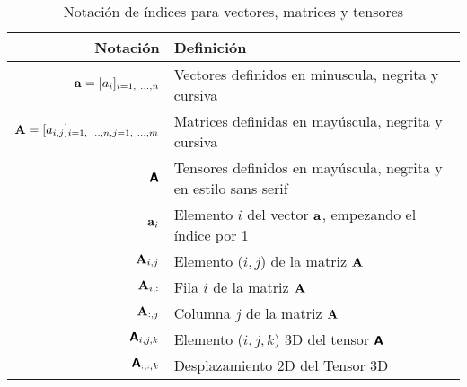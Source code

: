 \begin{table}[H]
    \begin{center}
        \begin{tabularx}{\textwidth}{|r|X|}
            \hline
            \textbf{Notación}                                                 & \textbf{Definición}                                                 \\
            \hline
            $ \mathit{\mathbf{{a}}} = [a_{i}]_{i=1, ~\ldots, n} $                    & Vectores definidos en minuscula, negrita y cursiva                  \\
            $ \mathit{\mathbf{{A}}} = [a_{i,j}]_{i=1, ~\ldots, n, j=1, ~\ldots, m} $ & Matrices definidas en mayúscula, negrita y cursiva                  \\
            $ \boldsymbol{\mathsf{{A}}} $                                                & Tensores definidos en mayúscula, negrita y en estilo sans serif     \\
            \hline
            ${ \mathit{\mathbf{{a}}}_{i} }$                                          & Elemento $i$ del vector $\mathit{\mathbf{{a}}}$, empezando el índice por 1 \\
            ${ \mathit{\mathbf{{A}}}_{i,j} }$                                        & Elemento ($i,j$) de la matriz $\mathit{\mathbf{{A}}}$                      \\
            ${ \mathit{\mathbf{{A}}}_{i,:} }$                                        & Fila $i$ de la matriz $\mathit{\mathbf{{A}}}$                              \\
            ${ \mathit{\mathbf{{A}}}_{:,j} }$                                        & Columna $j$ de la matriz $\mathit{\mathbf{{A}}}$                           \\
            ${ \boldsymbol{\mathsf{{A}}}_{i,j,k} }$                                      & Elemento ($i,j,k$) 3D del tensor $\boldsymbol{\mathsf{{A}}}$                   \\
            ${ \boldsymbol{\mathsf{{A}}}_{:,:,k} }$                                      & Desplazamiento 2D del Tensor 3D                                     \\
            \hline
        \end{tabularx}
        \caption{Notación de índices para vectores, matrices y tensores}
        \label{tab:notation-part-v-1}
    \end{center}
\end{table}

